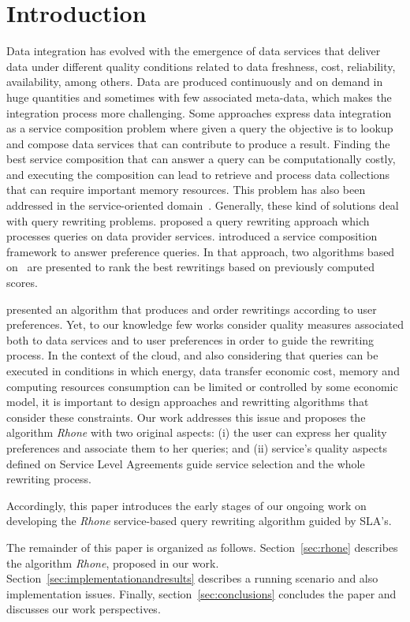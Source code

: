 \section{Introduction}
Data integration
has evolved with the emergence of data   services that deliver data under different quality conditions  related to data freshness, cost, reliability, availability, among others. Data are produced continuously and on demand in huge quantities and sometimes with few associated meta-data, which makes the integration process more challenging. Some approaches express data integration as a service composition problem where given a query the objective is to lookup and compose data services that can contribute to produce a result. Finding the best service composition that can answer a query can be computationally costly, and executing the composition can lead to retrieve and process data collections that can require important memory resources.
This problem has also been addressed in the service-oriented domain~\cite{Barhamgi2010,Benouaret2011,ba2014}.
Generally, these kind of solutions deal with query rewriting problems.
\cite{Barhamgi2010} proposed a query rewriting approach which processes queries on data provider services. \cite{Benouaret2011} introduced a service composition framework to answer preference queries. In that approach, two algorithms based on~\cite{Barhamgi2010} are presented to rank the best rewritings based on previously computed scores.

\cite{ba2014} presented an algorithm that produces and order rewritings according to user preferences. Yet, to our knowledge few works consider quality measures associated both to data services and to user preferences in order to guide the rewriting process. In the context of the cloud, and also considering that queries can be executed in conditions in which energy, data transfer economic cost, memory and computing resources consumption can be limited or controlled by some economic model, it is important to design approaches and rewritting algorithms that consider these constraints.
Our work addresses this issue and proposes the  algorithm \textit{Rhone} with  two original aspects: (i) the user can express her
quality preferences and associate them to her queries; and (ii)  service's quality
aspects defined on Service Level Agreements guide  service selection and  the whole rewriting process.    

 Accordingly, this paper introduces the early stages of our
ongoing work on developing the \textit{Rhone} service-based query rewriting
algorithm guided by SLA's.

The remainder of this paper is organized as follows. Section~\ref{sec:rhone}
describes the  algorithm \textit{Rhone}, proposed in our work. Section~\ref{sec:implementationandresults} describes
a running scenario and also  implementation issues.
Finally, section~\ref{sec:conclusions} concludes the paper and discusses our work perspectives.
